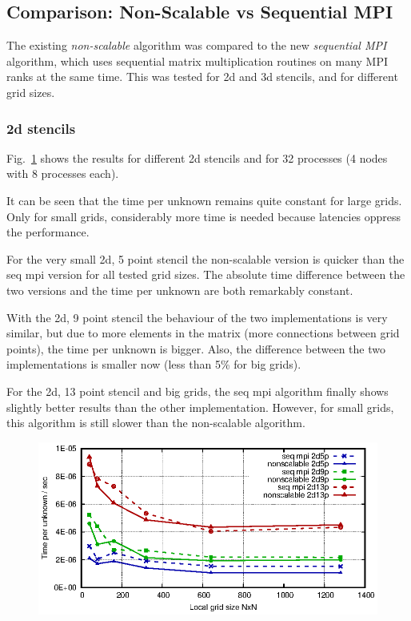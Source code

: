 \subsection{Comparison: Non-Scalable vs Sequential MPI}
The existing \textit{non-scalable} algorithm was compared to the new \textit{sequential MPI} algorithm, which uses sequential matrix multiplication routines on many MPI ranks at the same time. This was tested for 2d and 3d stencils, and for different grid sizes.

\subsubsection*{2d stencils}
Fig.~\ref{fig:mat_ex_test_ex2_times_2d} shows the results for different 2d stencils and for 32 processes (4 nodes with 8 processes each). 

It can be seen that the time per unknown remains quite constant for large grids. Only for small grids, considerably more time is needed because latencies oppress the performance.


For the very small 2d, 5 point stencil the non-scalable version is quicker than the seq mpi version for all tested grid sizes. The absolute time difference between the two versions and the time per unknown are both remarkably constant. 

With the 2d, 9 point stencil the behaviour of the two implementations is very similar, but due to more elements in the matrix (more connections between grid points), the time per unknown is bigger. Also, the difference between the two implementations is smaller now (less than 5\% for big grids). 

For the 2d, 13 point stencil and big grids, the seq mpi algorithm finally shows slightly better results than the other implementation. However, for small grids, this algorithm is still slower than the non-scalable algorithm. 

\begin{figure}[tbp]
	\centering
	\includegraphics[width=1\textwidth]{times_2d}
	\caption{} 
	\label{fig:mat_ex_test_ex2_times_2d}
\end{figure}

